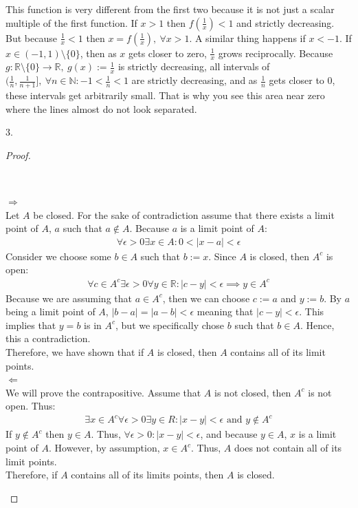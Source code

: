 \documentclass[11pt]{article}
\newcommand{\R}{\mathbb{R}}
\newcommand{\N}{\mathbb{N}}
\newenvironment{myproof}
{\begin{proof} \begin{adjustwidth}{3em}{0pt}$ $\par\nobreak\ignorespaces}
{\end{adjustwidth} \end{proof}}
\begin{document}
\begin{flushleft}
This function is very different from the first two because it is not just a scalar multiple of the first function. If $x > 1$ then $f(\frac{1}{x}) < 1$ and strictly decreasing. But because $\frac{1}{x} < 1$ then $x=f(\frac{1}{x}), \ \forall x > 1$. A similar thing happens if $x < -1$. If $x \in (-1,1) \setminus \{ 0 \}$, then as $x$ gets closer to zero, $\frac{1}{x}$ grows reciprocally. Because $g:\R \setminus \{ 0 \} \rightarrow \R, \ g(x):= \frac{1}{x}$ is strictly decreasing, all intervals of $(\frac{1}{n}, \frac{1}{n+1}], \ \forall n \in \N: -1<\frac{1}{n}<1$ are strictly decreasing, and as $\frac{1}{n}$ gets closer to 0, these intervals get arbitrarily small. That is why you see this area near zero where the lines almost do not look separated.
\newpage

3.

\begin{myproof}
$\Rightarrow$ \\
Let $A$ be closed. For the sake of contradiction assume that there exists a limit point of $A$, $a$ such that $a \notin A$. Because $a$ is a limit point of $A$:
\begin{align*}
\forall \epsilon > 0 \exists x \in A: 0< |x-a|< \epsilon
\end{align*}
Consider we choose some $b \in A$ such that $b := x$. Since $A$ is closed, then $A^c$ is open:
\begin{align*}
\forall c \in A^c \exists \epsilon > 0 \forall y \in \R: |c-y| < \epsilon \implies y \in A^c
\end{align*}
Because we are assuming that $a \in A^c$, then we can choose $c := a$ and $y := b$. By $a$ being a limit point of $A$, $|b-a|=|a-b|< \epsilon $ meaning that $|c-y| < \epsilon$. This implies that $y =b$ is in $A^c$, but we specifically chose $b$ such that $b \in A$. Hence, this a contradiction. \\
\bigskip
Therefore, we have shown that if $A$ is closed, then $A$ contains all of its limit points. \\
\bigskip
$\Leftarrow$ \\
We will prove the contrapositive. Assume that $A$ is not closed, then $A^c$ is not open. Thus:
\begin{align*}
\exists x \in A^c \forall \epsilon >0 \exists y \in R: |x-y|<\epsilon \text{ and } y \notin A^c
\end{align*}
If $y \notin A^c$ then $y \in A$. Thus, $\forall \epsilon > 0: |x-y| < \epsilon$, and because $y \in A$, $x$ is a limit point of $A$. However, by assumption, $x \in A^c$. Thus, $A$ does not contain all of its limit points. \\
\bigskip
Therefore, if $A$ contains all of its limits points, then $A$ is closed.


\end{myproof}
\end{flushleft}
\end{document}

